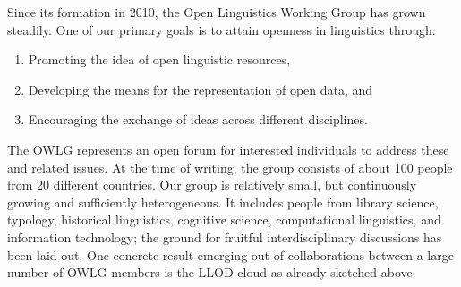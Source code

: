 Since its formation in 2010, the Open Linguistics Working Group has grown steadily. One of our primary goals is to attain openness in linguistics through:

\begin{enumerate}
\item Promoting the idea of open linguistic resources,
\item Developing the means for the representation of open data, and
\item Encouraging the exchange of ideas across different disciplines.
\end{enumerate}

\noindent 
%
The OWLG represents an open forum for interested individuals to address these and related issues.
At the time of writing, the group consists of about 100 people from 20 different countries.
Our group is relatively small, but continuously growing and sufficiently heterogeneous. It includes
people from library science, typology, historical linguistics, cognitive science, computational linguistics, and information technology; the ground for fruitful interdisciplinary discussions has been laid out.
One concrete result emerging out of collaborations between a large number of OWLG members is the LLOD cloud as already sketched above.

